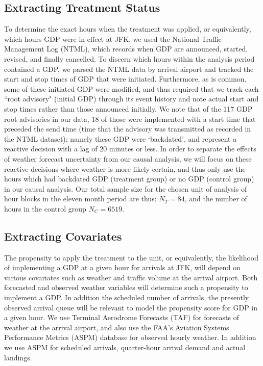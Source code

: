 \documentclass[conference]{IEEEtran}
\begin{document}
\subsection{Extracting Treatment Status}
To determine the exact hours when the treatment was applied, or equivalently, which hours GDP were in effect at JFK, we used the National Traffic Management Log (NTML), which records when GDP are announced, started, revised, and finally cancelled.  To discern which hours within the analysis period contained a GDP, we parsed the NTML data by arrival airport and tracked the start and stop times of GDP that were initiated.  Furthermore, as is common, some of these initiated GDP were modified, and thus required that we track each ``root advisory" (initial GDP) through its event history and note actual start and stop times rather than those announced initially.  We note that of the 117 GDP root advisories in our data, 18 of those were implemented with a start time that preceded the send time (time that the advisory was transmitted as recorded in the NTML dataset); namely these GDP were `backdated', and represent a reactive decision with a lag of 20 minutes or less.  In order to separate the effects of weather forecast uncertainty from our causal analysis, we will focus on these reactive decisions where weather is more likely certain, and thus only use the hours which had backdated GDP (treatment group) or no GDP (control group) in our causal analysis.  Our total sample size for the chosen unit of analysis of hour blocks in the eleven month period are thus: $N_T=84$, and the number of hours in the control group $N_C=6519$.  

\subsection{Extracting Covariates}
The propensity to apply the treatment to the unit, or equivalently, the likelihood of implementing a GDP at a given hour for arrivals at JFK, will depend on various covariates such as weather and traffic volume at the arrival airport.  Both forecasted and observed weather variables will determine such a propensity to implement a GDP.  In addition the scheduled number of arrivals, the presently observed arrival queue will be relevant to model the propensity score for GDP in a given hour.  We use Terminal Aerodrome Forecasts (TAF) for forecasts of weather at the arrival airport, and also use the FAA's Aviation Systems Performance Metrics (ASPM) database for observed hourly weather.  In addition we use ASPM for scheduled arrivals, quarter-hour arrival demand and actual landings.  
\end{document}
